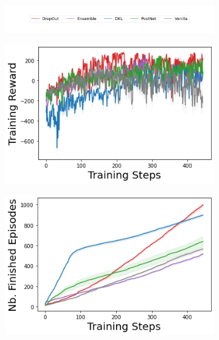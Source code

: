 \begin{figure}
    \centering
    \begin{subfigure}{.7\textwidth}
        \includegraphics[width=\textwidth]{sections/011_icml2022/resources/legend-standard.png}
    \end{subfigure}
    \vspace{-3mm}
    
    \begin{subfigure}{.3\textwidth}
        \includegraphics[width=\textwidth]{sections/011_icml2022/resources/lunarlander-training_total_reward-training-model+.png}
    \end{subfigure}
    \begin{subfigure}{.3\textwidth}
        \includegraphics[width=\textwidth]{sections/011_icml2022/resources/lunarlander-n_finished_training_episodes-training-model+.png}

\end{subfigure}
\end{figure}
